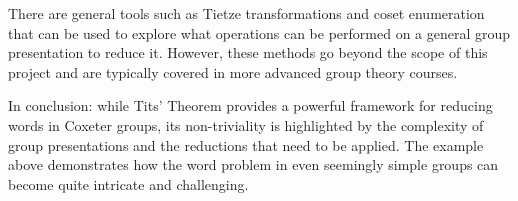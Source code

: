 \documentclass[../main.tex]{subfiles}
\begin{document}
There are general tools such as Tietze transformations and coset enumeration that can be used to explore what operations can be performed on a general group presentation to reduce it. However, these methods go beyond the scope of this project and are typically covered in more advanced group theory courses.

In conclusion: while Tits' Theorem provides a powerful framework for reducing words in Coxeter groups, its non-triviality is highlighted by the complexity of group presentations and the reductions that need to be applied. The example above demonstrates how the word problem in even seemingly simple groups can become quite intricate and challenging.
\end{document}
